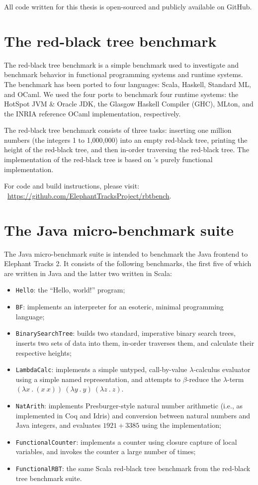 All code written for this thesis is open-sourced and publicly available on GitHub.

\section{The red-black tree benchmark}
The red-black tree benchmark is a simple benchmark used to investigate and benchmark behavior in functional programming
systems and runtime systems. The benchmark has been ported to four languages: Scala, Haskell, Standard ML, and OCaml. We
used the four ports to benchmark four runtime systems: the HotSpot JVM \& Oracle JDK, the Glasgow Haskell Compiler (GHC),
MLton, and the INRIA reference OCaml implementation, respectively.

The red-black tree benchmark consists of three tasks: inserting one million numbers (the integers 1 to 1,000,000) into
an empty red-black tree, printing the height of the red-black tree, and then in-order traversing the red-black tree. The
implementation of the red-black tree is based on \cite{PFDS}'s purely functional implementation.

For code and build instructions, please visit: ~\url{https://github.com/ElephantTracksProject/rbtbench}.

\section{The Java micro-benchmark suite}
The Java micro-benchmark suite is intended to benchmark the Java frontend to Elephant Tracks 2. It consists of the
following benchmarks, the first five of which are written in Java and the latter two written in Scala:
\begin{itemize}
\item \lstinline{Hello}: the ``Hello, world!'' program;
\item \lstinline{BF}: implements an interpreter for an esoteric, minimal programming language;
\item \lstinline{BinarySearchTree}: builds two standard, imperative binary search trees, inserts two sets of data into them,
in-order traverses them, and calculate their respective heights;
\item \lstinline{LambdaCalc}: implements a simple untyped, call-by-value $\lambda$-calculus evaluator using a simple named representation, and attempts
to $\beta$-reduce the $\lambda$-term \newline $(\lambda x \ . \ (x \ x)) \ (\lambda y \ . \ y) \ (\lambda z \ . \ z)$.
\item \lstinline{NatArith}: implements Presburger-style natural number arithmetic (i.e., as implemented in Coq and Idris) and
conversion between natural numbers and Java integers, and evaluates $1921 + 3385$ using the implementation;
\item \lstinline{FunctionalCounter}: implements a counter using closure capture of local variables, and invokes the counter
a large number of times;
\item \lstinline{FunctionalRBT}: the same Scala red-black tree benchmark from the red-black tree benchmark suite.
\end{itemize}

